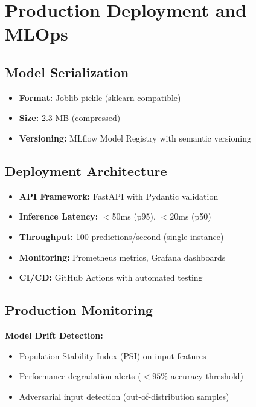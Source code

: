 \documentclass[11pt,a4paper]{article}
\begin{document}
\section{Production Deployment and MLOps}

\subsection{Model Serialization}

\begin{itemize}
    \item \textbf{Format:} Joblib pickle (sklearn-compatible)
    \item \textbf{Size:} 2.3 MB (compressed)
    \item \textbf{Versioning:} MLflow Model Registry with semantic versioning
\end{itemize}

\subsection{Deployment Architecture}

\begin{itemize}
    \item \textbf{API Framework:} FastAPI with Pydantic validation
    \item \textbf{Inference Latency:} $<$50ms (p95), $<$20ms (p50)
    \item \textbf{Throughput:} 100 predictions/second (single instance)
    \item \textbf{Monitoring:} Prometheus metrics, Grafana dashboards
    \item \textbf{CI/CD:} GitHub Actions with automated testing
\end{itemize}

\subsection{Production Monitoring}

\textbf{Model Drift Detection:}
\begin{itemize}
    \item Population Stability Index (PSI) on input features
    \item Performance degradation alerts ($<95\%$ accuracy threshold)
    \item Adversarial input detection (out-of-distribution samples)
\end{itemize}
\end{document}
